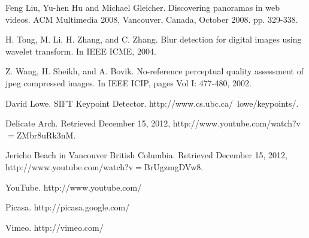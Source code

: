 
\begin{thebibliography}{99}

  
 Feng Liu, Yu-hen Hu and Michael Gleicher. Discovering panoramas in web videos. 
ACM Multimedia 2008, Vancouver, Canada, October 2008. pp. 329-338.  

 H. Tong, M. Li, H. Zhang, and C. Zhang. Blur
detection for digital images using wavelet transform.
In IEEE ICME, 2004.

 Z. Wang, H. Sheikh, and A. Bovik. No-reference
perceptual quality assessment of jpeg compressed
images. In IEEE ICIP, pages Vol I: 477-480, 2002.

 David Lowe. SIFT Keypoint Detector.
http://www.cs.ubc.ca/~lowe/keypoints/.

 Delicate Arch.  Retrieved December 15, 2012,
http://www.youtube.com/watch?v$=$ZMbr8uRk3nM.

 Jericho Beach in Vancouver British Columbia.  Retrieved December 15, 2012,
http://www.youtube.com/watch?v$=$BrUgzmgDVw8.

 YouTube. http://www.youtube.com/

 Picasa. http://picasa.google.com/

 Vimeo. http://vimeo.com/




\end{thebibliography}

